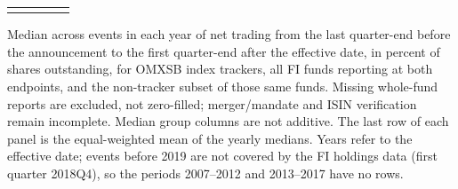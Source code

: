 \begin{threeparttable}
\begin{tabular}{@{}lcccc}
\addlinespace[0.25ex]
\bottomrule
\end{tabular}
\endgroup
\noindent\begin{minipage}{\linewidth}\smallskip\footnotesize
Median across events in each year of net trading from the last quarter-end before the announcement to the first quarter-end after the effective date, in percent of shares outstanding, for OMXSB index trackers, all FI funds reporting at both endpoints, and the non-tracker subset of those same funds. Missing whole-fund reports are excluded, not zero-filled; merger/mandate and ISIN verification remain incomplete. Median group columns are not additive. The last row of each panel is the equal-weighted mean of the yearly medians. Years refer to the effective date; events before 2019 are not covered by the FI holdings data (first quarter 2018Q4), so the periods 2007–2012 and 2013–2017 have no rows.\end{minipage}

\end{threeparttable}